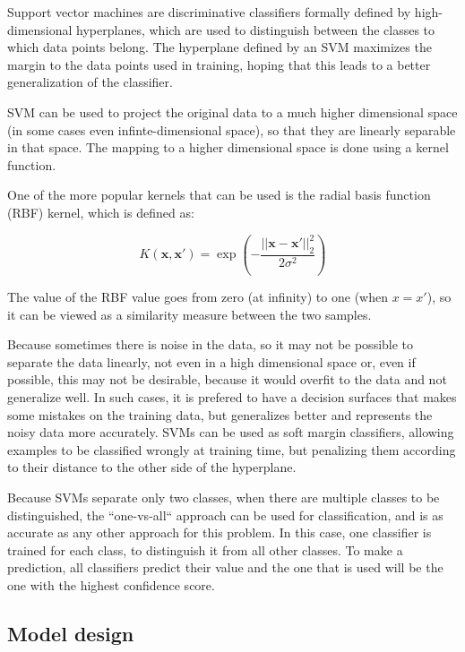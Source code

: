 Support vector machines\cite{Cortes_1995} are discriminative classifiers formally defined by high-dimensional hyperplanes, which are used to distinguish between the classes to which data points belong. The hyperplane defined by an SVM maximizes the margin to the data points used in training, hoping that this leads to a better generalization of the classifier. 

SVM can be used to project the original data to a much higher dimensional space (in some cases even infinte-dimensional space), so that they are linearly separable in that space. The mapping to a higher dimensional space is done using a kernel function. 

One of the more popular kernels\cite{Chang:2010:TTL:1756006.1859899} that can be used is the radial basis function (RBF) kernel, which is defined as:

\[

    K(\mathbf{x}, \mathbf{x'}) = \exp\left(-\frac{||\mathbf{x} - \mathbf{x'}||_2^2}{2\sigma^2}\right) 
\]

The value of the RBF value goes from zero (at infinity) to one (when $ x = x'$), so it can be viewed as a similarity measure between the two samples. \cite{Vert}

Because sometimes there is noise in the data, so it may not be possible to separate the data linearly, not even in a high dimensional space or, even if possible, this may not be desirable, because it would overfit to the data and not generalize well. In such cases, it is prefered to have a decision surfaces that makes some mistakes on the training data, but generalizes better and represents the noisy data more accurately. SVMs can be used as soft margin classifiers, allowing examples to be classified wrongly at training time, but penalizing them according to their distance to the other side of the hyperplane. \cite{russell1995artificial}

Because SVMs separate only two classes, when there are multiple classes to be distinguished, the ``one-vs-all`` approach can be used for classification, and is as accurate as any other approach for this problem\cite{rifkin2004defense}. In this case, one classifier is trained for each class, to distinguish it from all other classes. To make a prediction, all classifiers predict their value and the one that is used will be the one with the highest confidence score.

\subsection{Model design}

